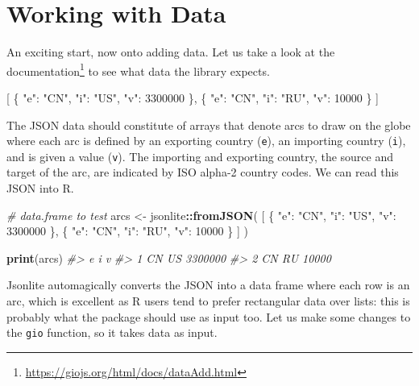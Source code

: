 \documentclass[
  10pt,
]{krantz}
\makeatletter
\newenvironment{Shaded}{\begin{snugshade}}{\end{snugshade}}
\newcommand{\CommentTok}[1]{\textcolor[rgb]{0.37,0.37,0.37}{\textit{#1}}}
\newcommand{\DataTypeTok}[1]{\textcolor[rgb]{0.27,0.27,0.27}{#1}}
\newcommand{\DecValTok}[1]{\textcolor[rgb]{0.06,0.06,0.06}{#1}}
\newcommand{\FunctionTok}[1]{\textcolor[rgb]{0,0,0}{#1}}
\newcommand{\KeywordTok}[1]{\textcolor[rgb]{0.27,0.27,0.27}{\textbf{#1}}}
\newcommand{\NormalTok}[1]{#1}
\newcommand{\OperatorTok}[1]{\textcolor[rgb]{0.43,0.43,0.43}{\textbf{#1}}}
\newcommand{\OtherTok}[1]{\textcolor[rgb]{0.37,0.37,0.37}{#1}}
\newcommand{\StringTok}[1]{\textcolor[rgb]{0.5,0.5,0.5}{#1}}
\renewcommand{\href}[2]{#2\footnote{\url{#1}}}
\newenvironment{kframe}{%
\medskip{}
\setlength{\fboxsep}{.8em}
 \def\at@end@of@kframe{}%
 \ifinner\ifhmode%
  \def\at@end@of@kframe{\end{minipage}}%
  \begin{minipage}{\columnwidth}%
 \fi\fi%
 \def\FrameCommand##1{\hskip\@totalleftmargin \hskip-\fboxsep
 \colorbox{shadecolor}{##1}\hskip-\fboxsep
     \hskip-\linewidth \hskip-\@totalleftmargin \hskip\columnwidth}%
 \MakeFramed {\advance\hsize-\width
   \@totalleftmargin\z@ \linewidth\hsize
   \@setminipage}}%
 {\par\unskip\endMakeFramed%
 \at@end@of@kframe}
\renewenvironment{Shaded}{\begin{kframe}}{\end{kframe}}
\makeatother
\begin{document}
\hypertarget{widgets-full-data}{%
\section{Working with Data}\label{widgets-full-data}}

An exciting start, now onto adding data. Let us take a look at the \href{https://giojs.org/html/docs/dataAdd.html}{documentation} to see what data the library expects.

\begin{Shaded}
\begin{Highlighting}[]
\OtherTok{[}
  \FunctionTok{\{}
    \DataTypeTok{"e"}\FunctionTok{:} \StringTok{"CN"}\FunctionTok{,}
    \DataTypeTok{"i"}\FunctionTok{:} \StringTok{"US"}\FunctionTok{,}
    \DataTypeTok{"v"}\FunctionTok{:} \DecValTok{3300000}
  \FunctionTok{\}}\OtherTok{,}
  \FunctionTok{\{}
    \DataTypeTok{"e"}\FunctionTok{:} \StringTok{"CN"}\FunctionTok{,}
    \DataTypeTok{"i"}\FunctionTok{:} \StringTok{"RU"}\FunctionTok{,}
    \DataTypeTok{"v"}\FunctionTok{:} \DecValTok{10000}
  \FunctionTok{\}}
\OtherTok{]}
\end{Highlighting}
\end{Shaded}

The JSON data should constitute of arrays that denote arcs to draw on the globe where each arc is defined by an exporting country (\texttt{e}), an importing country (\texttt{i}), and is given a value (\texttt{v}). The importing and exporting country, the source and target of the arc, are indicated by ISO alpha-2 country codes. We can read this JSON into R.

\begin{Shaded}
\begin{Highlighting}[]
\CommentTok{\# data.frame to test}
\NormalTok{arcs <{-}}\StringTok{ }\NormalTok{jsonlite}\OperatorTok{::}\KeywordTok{fromJSON}\NormalTok{(}
  \StringTok{\textquotesingle{}[}
\StringTok{    \{}
\StringTok{      "e": "CN",}
\StringTok{      "i": "US",}
\StringTok{      "v": 3300000}
\StringTok{    \},}
\StringTok{    \{}
\StringTok{      "e": "CN",}
\StringTok{      "i": "RU",}
\StringTok{      "v": 10000}
\StringTok{    \}}
\StringTok{  ]\textquotesingle{}}
\NormalTok{)}

\KeywordTok{print}\NormalTok{(arcs)}
\CommentTok{\#>    e  i       v}
\CommentTok{\#> 1 CN US 3300000}
\CommentTok{\#> 2 CN RU   10000}
\end{Highlighting}
\end{Shaded}

Jsonlite automagically converts the JSON into a data frame where each row is an arc, which is excellent as R users tend to prefer rectangular data over lists: this is probably what the package should use as input too. Let us make some changes to the \texttt{gio} function, so it takes data as input.
\end{document}
